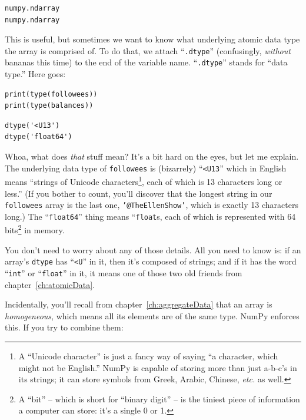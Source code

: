\begin{Verbatim}[fontsize=\small,samepage=true,frame=leftline,framesep=5mm,framerule=1mm]
numpy.ndarray
numpy.ndarray
\end{Verbatim}

This is useful, but sometimes we want to know what underlying atomic data type
the array is comprised of. To do that, we attach ``\texttt{.dtype}''
(confusingly, \textit{without} bananas this time) to the end of the variable
name. ``\texttt{.dtype}'' stands for ``data type.'' Here goes:

\begin{Verbatim}[fontsize=\small,samepage=true,frame=single,framesep=3mm]
print(type(followees))
print(type(balances))
\end{Verbatim}

\begin{Verbatim}[fontsize=\small,samepage=true,frame=leftline,framesep=5mm,framerule=1mm]
dtype('<U13')
dtype('float64')
\end{Verbatim}

Whoa, what does \textit{that} stuff mean? It's a bit hard on the eyes, but let
me explain. The underlying data type of \texttt{followees} is (bizarrely)
``\texttt{<U13}'' which in English means ``strings of Unicode
characters\footnote{A ``Unicode character'' is just a fancy way of saying ``a
character, which might not be English.'' NumPy is capable of storing more than
just a-b-c's in its strings; it can store symbols from Greek, Arabic, Chinese,
\textit{etc.} as well.}, each of which is 13 characters long or less.'' (If you
bother to count, you'll discover that the longest string in our
\texttt{followees} array is the last one, \texttt{'@TheEllenShow'}, which is
exactly 13 characters long.) The ``\texttt{float64}'' thing means
``\texttt{float}s, each of which is represented with 64 bits\footnote{A ``bit''
-- which is short for ``binary digit'' -- is the tiniest piece of information a
computer can store: it's a single 0 or 1.} in memory.

You don't need to worry about any of those details. All you need to know is: if
an array's \texttt{dtype} has ``\texttt{<U}'' in it, then it's composed of
strings; and if it has the word ``\texttt{int}'' or ``\texttt{float}'' in it,
it means one of those two old friends from chapter~\ref{ch:atomicData}.

Incidentally, you'll recall from chapter~\ref{ch:aggregateData} that an array
is \textit{homogeneous}, which means all its elements are of the same type.
NumPy enforces this. If you try to combine them:

